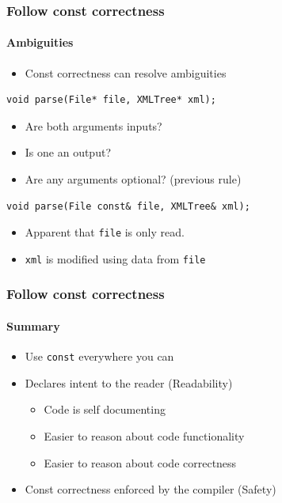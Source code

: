 \documentclass[table]{beamer}
\newcounter{rulecount}
\newcommand{\declarerule}{\textbf{\color{themeblue}{Rule \therulecount:}} }
\begin{document}
\begin{frame}[fragile]
    \frametitle{\declarerule Follow const correctness}
    \framesubtitle{Ambiguities}
    \begin{itemize}
        \item Const correctness can resolve ambiguities
    \end{itemize}
    \begin{lstlisting}[title=Ambiguous declaration without const]
void parse(File* file, XMLTree* xml);
    \end{lstlisting}
    \begin{itemize}
        \item Are both arguments inputs?
        \item Is one an output?
        \item Are any arguments optional? (previous rule)
    \end{itemize}
    \begin{lstlisting}[title=Const correct]
void parse(File const& file, XMLTree& xml);
    \end{lstlisting}
    \begin{itemize}
        \item Apparent that \texttt{file} is only read.
        \item \texttt{xml} is modified using data from \texttt{file}
    \end{itemize}
\end{frame}

\begin{frame}[fragile]
    \frametitle{\declarerule Follow const correctness}
    \framesubtitle{Summary}
    \begin{itemize}
        \item Use \texttt{const} everywhere you can
        \item Declares intent to the reader (\alert{Readability})
            \begin{itemize}
                \item Code is self documenting
                \item Easier to reason about code functionality
                \item Easier to reason about code correctness
            \end{itemize}
        \item Const correctness enforced by the compiler (\alert{Safety})
    \end{itemize}
\end{frame}
\end{document}
